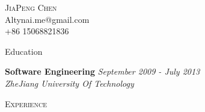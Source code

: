 ﻿\documentclass[9pt]{article}
\newenvironment{changemargin}[2]{%
  \begin{list}{}{%
    \setlength{\topsep}{0pt}%
    \setlength{\leftmargin}{#1}%
    \setlength{\rightmargin}{#2}%
    \setlength{\listparindent}{\parindent}%
    \setlength{\itemindent}{\parindent}%
    \setlength{\parsep}{\parskip}%
  }%
  \item[]}{\end{list}
}
\newcommand{\lineover}{
	\begin{changemargin}{-0.05in}{-0.05in}
		\vspace*{-8pt}
		\hrulefill \\
		\vspace*{-2pt}
	\end{changemargin}
}
\newcommand{\header}[1]{
	\begin{changemargin}{-0.5in}{-0.5in}
		\scshape{#1}\\
  	\lineover
	\end{changemargin}
}
\newcommand{\contact}[4]{
	\begin{changemargin}{-0.5in}{-0.5in}
		\begin{center}
			{\Large \scshape {#1}}\\ \smallskip
			{#2}\\ \smallskip
			{#3}\\ \smallskip
			{#4}\smallskip
		\end{center}
	\end{changemargin}
}
\newenvironment{body} {
	\vspace*{-16pt}
	\begin{changemargin}{-0.25in}{-0.5in}
  }
	{\end{changemargin}
}
\begin{document}
\contact{JiaPeng Chen}{Altynai.me@gmail.com}{+86 15068821836}

\header{Education}
\begin{body}
	\vspace{14pt}
	\textbf{Software Engineering} \hfill \emph{September 2009 - July 2013} \\
	\emph{ZheJiang University Of Technology}\\
\end{body}

\smallskip

\header{Experience}
\end{document}
